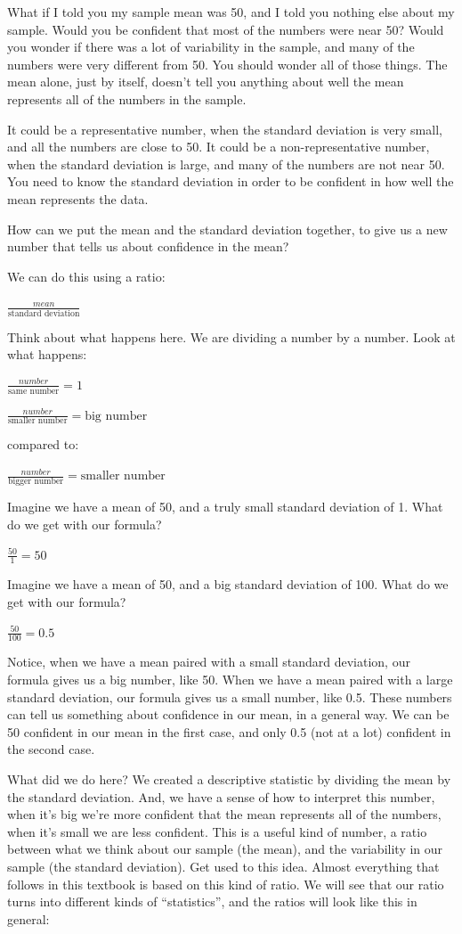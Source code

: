\documentclass[]{book}
\begin{document}
What if I told you my sample mean was 50, and I told you nothing else about my sample. Would you be confident that most of the numbers were near 50? Would you wonder if there was a lot of variability in the sample, and many of the numbers were very different from 50. You should wonder all of those things. The mean alone, just by itself, doesn't tell you anything about well the mean represents all of the numbers in the sample.

It could be a representative number, when the standard deviation is very small, and all the numbers are close to 50. It could be a non-representative number, when the standard deviation is large, and many of the numbers are not near 50. You need to know the standard deviation in order to be confident in how well the mean represents the data.

How can we put the mean and the standard deviation together, to give us a new number that tells us about confidence in the mean?

We can do this using a ratio:

\(\frac{mean}{\text{standard deviation}}\)

Think about what happens here. We are dividing a number by a number. Look at what happens:

\(\frac{number}{\text{same number}} = 1\)

\(\frac{number}{\text{smaller number}} = \text{big number}\)

compared to:

\(\frac{number}{\text{bigger number}} = \text{smaller number}\)

Imagine we have a mean of 50, and a truly small standard deviation of 1. What do we get with our formula?

\(\frac{50}{1} = 50\)

Imagine we have a mean of 50, and a big standard deviation of 100. What do we get with our formula?

\(\frac{50}{100} = 0.5\)

Notice, when we have a mean paired with a small standard deviation, our formula gives us a big number, like 50. When we have a mean paired with a large standard deviation, our formula gives us a small number, like 0.5. These numbers can tell us something about confidence in our mean, in a general way. We can be 50 confident in our mean in the first case, and only 0.5 (not at a lot) confident in the second case.

What did we do here? We created a descriptive statistic by dividing the mean by the standard deviation. And, we have a sense of how to interpret this number, when it's big we're more confident that the mean represents all of the numbers, when it's small we are less confident. This is a useful kind of number, a ratio between what we think about our sample (the mean), and the variability in our sample (the standard deviation). Get used to this idea. Almost everything that follows in this textbook is based on this kind of ratio. We will see that our ratio turns into different kinds of ``statistics'', and the ratios will look like this in general:
\end{document}
